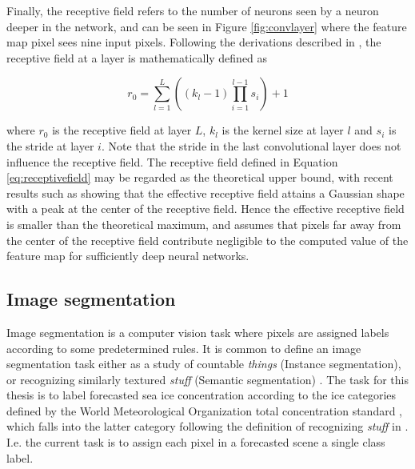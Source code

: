 \documentclass[../main/thesis.tex]{subfiles}
\begin{document}
Finally, the receptive field refers to the number of neurons seen by a neuron deeper in the network, and can be seen in Figure \ref{fig:convlayer} where the feature map pixel sees nine input pixels. Following the derivations described in \citet{Araujo2019}, the receptive field at a layer is mathematically defined as

\begin{equation}
    \label{eq:receptivefield}
    r_0 = \sum_{l=1}^L\left(\left(k_l - 1\right)\prod_{i=1}^{l-1}s_i\right) + 1
\end{equation}

where $r_0$ is the receptive field at layer $L$, $k_l$ is the kernel size at layer $l$ and $s_i$ is the stride at layer $i$. Note that the stride in the last convolutional layer does not influence the receptive field. The receptive field defined in Equation \ref{eq:receptivefield} may be regarded as the theoretical upper bound, with recent results such as \citet{Luo2017} showing that the effective receptive field attains a Gaussian shape with a peak at the center of the receptive field. Hence the effective receptive field is smaller than the theoretical maximum, and assumes that pixels far away from the center of the receptive field contribute negligible to the computed value of the feature map for sufficiently deep neural networks.

\subsection{Image segmentation}
\label{sec:image-segmentation}
Image segmentation is a computer vision task where pixels are assigned labels according to some predetermined rules. It is common to define an image segmentation task either as a study of countable \textit{things} (Instance segmentation), or recognizing similarly textured \textit{stuff} (Semantic segmentation) \citep{Kirillov2018}. The task for this thesis is to label forecasted sea ice concentration according to the ice categories defined by the World Meteorological Organization total concentration standard \citep{WMO2014}, which falls into the latter category following the definition of recognizing \textit{stuff} in \citet{Adelson2001}. I.e. the current task is to assign each pixel in a forecasted scene a single class label.
\end{document}
